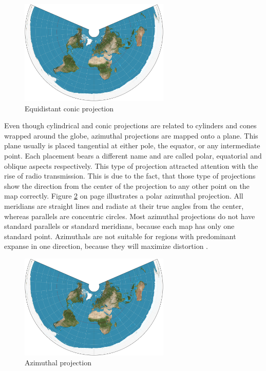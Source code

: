 \begin{enumerate}
\begin{figure}[!htb]
\centering
\includegraphics[height=5cm,keepaspectratio]{images/methods/projections/equidistant.jpg}
\caption[
    Equidistant conic projection, Urldate: 07.2016 \newline
    \small\texttt{\url{https://upload.wikimedia.org/wikipedia/commons/d/d8/Equidistant_conic_projection_SW.JPG}}.
]{Equidistant conic projection}
\label{fig:projections-equidistant}
\end{figure}

\end{enumerate}
Even though cylindrical and conic projections are related to cylinders and cones wrapped around the globe, azimuthal projections are mapped onto a plane. This plane usually is placed tangential at either pole, the equator, or any intermediate point. Each placement bears a different name and are called polar, equatorial and oblique aspects respectively. This type of projection attracted attention with the rise of radio transmission. This is due to the fact, that those type of projections show the direction from the center of the projection to any other point on the map correctly. Figure \ref{fig:projections-azimuthal} on page \pageref{fig:projections-azimuthal} illustrates a polar azimuthal projection. All meridians are straight lines and radiate at their true angles from the center, whereas parallels are concentric circles. Most azimuthal projections do not have standard parallels or standard meridians, because each map has only one standard point. Azimuthals are not suitable for regions with predominant expanse in one direction, because they will maximize distortion .

\begin{figure}[!htb]
\centering
\includegraphics[height=5cm,keepaspectratio]{images/methods/projections/equidistant.jpg}
\caption[
    Azimuthal projection, Urldate: 07.2016 \newline
    \small\texttt{\url{https://upload.wikimedia.org/wikipedia/commons/e/ec/Azimuthal_equidistant_projection_SW.jpg}}.
]{Azimuthal projection}
\label{fig:projections-azimuthal}
\end{figure}